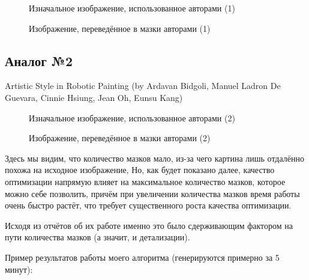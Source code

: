 \documentclass[11pt]{article}
\begin{document}
    \begin{figure}[h!]
        \centering
        \caption{Изначальное изображение, использованное авторами (1)}
        \label{fig:initial_hod}
    \end{figure}

    \begin{figure}[h!]
        \centering
        \caption{Изображение, переведённое в мазки авторами (1)}
        \label{fig:result_hod}
    \end{figure}

    \FloatBarrier

    \subsection{Аналог №2}\label{subsec:analog-2}
    Artistic Style in Robotic Painting (by Ardavan Bidgoli, Manuel Ladron De Guevara, Cinnie Hsiung, Jean Oh, Eunsu Kang)

    \begin{figure}[h!]
        \centering
        \caption{Изначальное изображение, использованное авторами (2)}
        \label{fig:initial_bidgoli}
    \end{figure}

    \begin{figure}[h!]
        \centering
        \caption{Изображение, переведённое в мазки авторами (2)}
        \label{fig:result_bidgoli}
    \end{figure}

    \FloatBarrier


    Здесь мы видим, что количество мазков мало, из-за чего картина лишь отдалённо похожа на исходное изображение,
    Но, как будет показано далее, качество оптимизации напрямую влияет на максимальное количество мазков, которое можно себе позволить,
    причём при увеличении количества мазков время работы очень быстро растёт, что требует существенного роста качества оптимизации.

    Исходя из отчётов об их работе именно это было сдерживающим фактором на пути количества мазков (а значит, и детализации).

    Пример результатов работы моего алгоритма (генерируются примерно за 5 минут):
\end{document}
